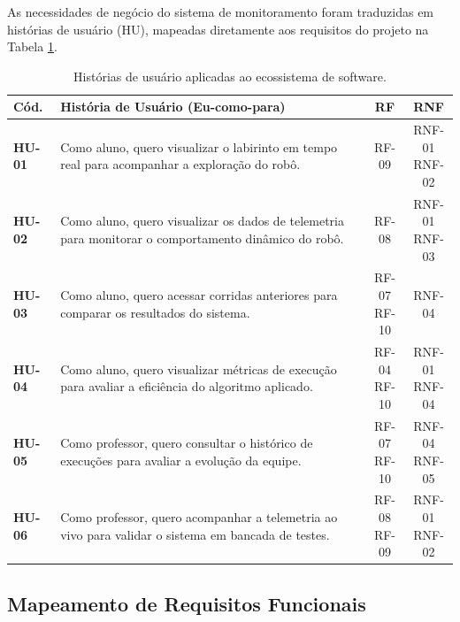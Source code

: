 As necessidades de negócio do sistema de monitoramento foram traduzidas em histórias de usuário (HU), mapeadas diretamente aos requisitos do projeto na Tabela \ref{tab:historias_usuario}.

\begin{table}[H]
    \centering
    \small
    \renewcommand{\arraystretch}{1.3}
    \begin{tabularx}{\linewidth}{|l|X|c|c|}
        \hline
        \textbf{Cód.} & \textbf{História de Usuário (Eu-como-para)} & \textbf{RF} & \textbf{RNF} \\ \hline
        \textbf{HU-01} & Como aluno, quero visualizar o labirinto em tempo real para acompanhar a exploração do robô. & RF-09 & \makecell{RNF-01 \\ RNF-02} \\ \hline
        \textbf{HU-02} & Como aluno, quero visualizar os dados de telemetria para monitorar o comportamento dinâmico do robô. & RF-08 & \makecell{RNF-01 \\ RNF-03} \\ \hline
        \textbf{HU-03} & Como aluno, quero acessar corridas anteriores para comparar os resultados do sistema. & \makecell{RF-07 \\ RF-10} & RNF-04 \\ \hline
        \textbf{HU-04} & Como aluno, quero visualizar métricas de execução para avaliar a eficiência do algoritmo aplicado. & \makecell{RF-04 \\ RF-10} & \makecell{RNF-01 \\ RNF-04} \\ \hline
        \textbf{HU-05} & Como professor, quero consultar o histórico de execuções para avaliar a evolução da equipe. & \makecell{RF-07 \\ RF-10} & \makecell{RNF-04 \\ RNF-05} \\ \hline
        \textbf{HU-06} & Como professor, quero acompanhar a telemetria ao vivo para validar o sistema em bancada de testes. & \makecell{RF-08 \\ RF-09} & \makecell{RNF-01 \\ RNF-02} \\ \hline
    \end{tabularx}
    \caption{Histórias de usuário aplicadas ao ecossistema de software.}
    \label{tab:historias_usuario}
\end{table}

\subsection*{Mapeamento de Requisitos Funcionais}

